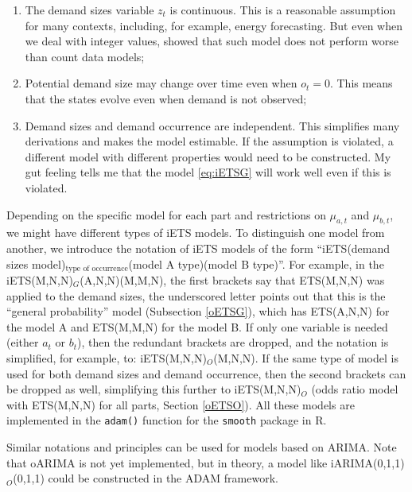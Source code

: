\documentclass[
]{book}
\providecommand{\tightlist}{%
  \setlength{\itemsep}{0pt}\setlength{\parskip}{0pt}}
\theoremstyle{definition}
\theoremstyle{definition}
\theoremstyle{definition}
\theoremstyle{definition}
\theoremstyle{remark}
\begin{document}
\begin{enumerate}
\def\labelenumi{\arabic{enumi}.}
\tightlist
\item
  The demand sizes variable \(z_t\) is continuous. This is a reasonable assumption for many contexts, including, for example, energy forecasting. But even when we deal with integer values, \citet{Svetunkov2019a} showed that such model does not perform worse than count data models;
\item
  Potential demand size may change over time even when \(o_t=0\). This means that the states evolve even when demand is not observed;
\item
  Demand sizes and demand occurrence are independent. This simplifies many derivations and makes the model estimable. If the assumption is violated, a different model with different properties would need to be constructed. My gut feeling tells me that the model \eqref{eq:iETSG} will work well even if this is violated.
\end{enumerate}

Depending on the specific model for each part and restrictions on \(\mu_{a,t}\) and \(\mu_{b,t}\), we might have different types of iETS models. To distinguish one model from another, we introduce the notation of iETS models of the form ``iETS(demand sizes model)\(_\text{type of occurrence}\)(model A type)(model B type)''. For example, in the iETS(M,N,N)\(_G\)(A,N,N)(M,M,N), the first brackets say that ETS(M,N,N) was applied to the demand sizes, the underscored letter points out that this is the ``general probability'' model (Subsection \ref{oETSG}), which has ETS(A,N,N) for the model A and ETS(M,M,N) for the model B. If only one variable is needed (either \(a_t\) or \(b_t\)), then the redundant brackets are dropped, and the notation is simplified, for example, to: iETS(M,N,N)\(_O\)(M,N,N). If the same type of model is used for both demand sizes and demand occurrence, then the second brackets can be dropped as well, simplifying this further to iETS(M,N,N)\(_O\) (odds ratio model with ETS(M,N,N) for all parts, Section \ref{oETSO}). All these models are implemented in the \texttt{adam()} function for the \texttt{smooth} package in R.

Similar notations and principles can be used for models based on ARIMA. Note that oARIMA is not yet implemented, but in theory, a model like iARIMA(0,1,1)\(_O\)(0,1,1) could be constructed in the ADAM framework.
\end{document}
